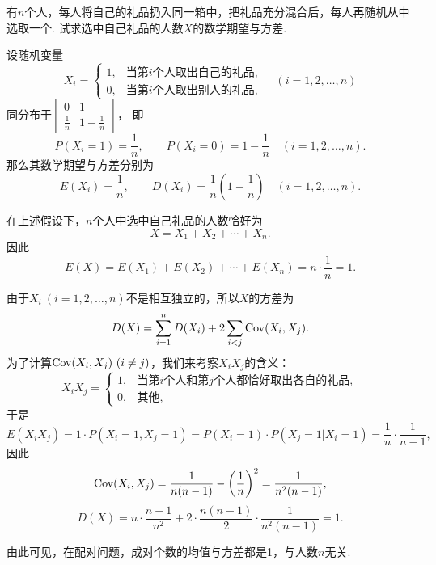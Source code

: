 \begin{example}[配对问题]
有\(n\)个人，每人将自己的礼品扔入同一箱中，把礼品充分混合后，每人再随机从中选取一个.
试求选中自己礼品的人数\(X\)的数学期望与方差.
\begin{solution}
设随机变量\[
    X_i = \left\{ \begin{array}{ll}
    1, & \text{当第\(i\)个人取出自己的礼品}, \\
    0, & \text{当第\(i\)个人取出别人的礼品},
    \end{array} \right.
    \quad(i=1,2,\dotsc,n)
\]同分布于\(\begin{bmatrix}
	0 & 1 \\
	\frac{1}{n} & 1-\frac{1}{n}
\end{bmatrix}\)，
即\[
    P(X_i=1) = \frac{1}{n}, \qquad
    P(X_i=0) = 1-\frac{1}{n}
    \quad(i=1,2,\dotsc,n).
\]
那么其数学期望与方差分别为\[
    E(X_i) = \frac{1}{n},
    \qquad
    D(X_i) = \frac{1}{n}\left(1-\frac{1}{n}\right)
    \quad(i=1,2,\dotsc,n).
\]

在上述假设下，\(n\)个人中选中自己礼品的人数恰好为\[
    X = X_1+X_2+\dotsb+X_n.
\]因此\[
    E(X) = E(X_1)+E(X_2)+\dotsb+E(X_n)
    = n \cdot \frac{1}{n}
    = 1.
\]

由于\(X_i\ (i=1,2,\dotsc,n)\)不是相互独立的，所以\(X\)的方差为\[
    D(X) = \sum_{i=1}^n D(X_i) + 2 \sum_{i<j} \operatorname{Cov}(X_i,X_j).
\]
为了计算\(\operatorname{Cov}(X_i,X_j)\ (i \neq j)\)，我们来考察\(X_i X_j\)的含义：\[
    X_i X_j = \left\{ \begin{array}{ll}
    1, & \text{当第\(i\)个人和第\(j\)个人都恰好取出各自的礼品}, \\
    0, & \text{其他},
    \end{array} \right.
\]于是\[
    E(X_i X_j) = 1 \cdot P(X_i=1,X_j=1)
    = P(X_i=1) \cdot P(X_j=1 \vert X_i=1)
    = \frac{1}{n} \cdot \frac{1}{n-1},
\]
因此\[
    \operatorname{Cov}(X_i,X_j) = \frac{1}{n(n-1)} - \left(\frac{1}{n}\right)^2
    = \frac{1}{n^2(n-1)},
\]\[
    D(X) = n \cdot \frac{n-1}{n^2} + 2 \cdot \frac{n(n-1)}{2} \cdot \frac{1}{n^2(n-1)}
    = 1.
\]
\end{solution}
由此可见，在配对问题，成对个数的均值与方差都是1，与人数\(n\)无关.
\end{example}


